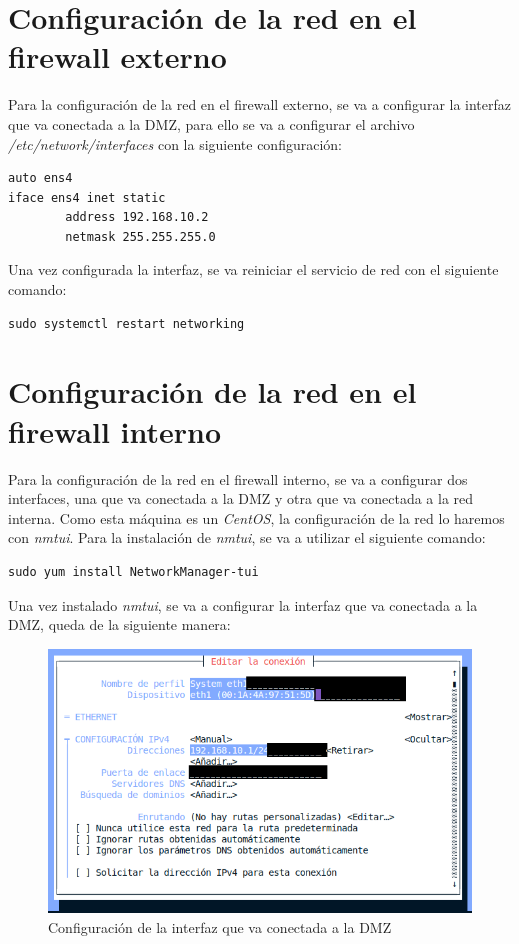 \documentclass[11pt]{report}
\begin{document}

\section{Configuración de la red en el firewall externo}
Para la configuración de la red en el firewall externo, se va a configurar la interfaz que
va conectada a la DMZ, para ello se va a configurar el archivo \emph{/etc/network/interfaces}
con la siguiente configuración:
\begin{verbatim}
auto ens4
iface ens4 inet static
        address 192.168.10.2
        netmask 255.255.255.0
\end{verbatim}

Una vez configurada la interfaz, se va reiniciar el servicio de red con el siguiente comando: \\
\begin{BVerbatim}
sudo systemctl restart networking
\end{BVerbatim}

\cleardoublepage

\section{Configuración de la red en el firewall interno}
Para la configuración de la red en el firewall interno, se va a configurar dos interfaces, una
que va conectada a la DMZ y otra que va conectada a la red interna. Como esta máquina es un \emph{CentOS},
la configuración de la red lo haremos con \emph{nmtui}. Para la instalación de \emph{nmtui}, se va a utilizar
el siguiente comando:
\begin{BVerbatim}
sudo yum install NetworkManager-tui
\end{BVerbatim}

Una vez instalado \emph{nmtui}, se va a configurar la interfaz que va conectada a la DMZ, queda de la siguiente
manera:
\begin{figure}[H]
  \centering
  \includegraphics[scale=0.5]{img/fw-interno_to_DMZ.png}
  \caption{Configuración de la interfaz que va conectada a la DMZ}
  \label{fig:Configuracion de la interfaz que va conectada a la DMZ}
\end{figure}
\end{document}
